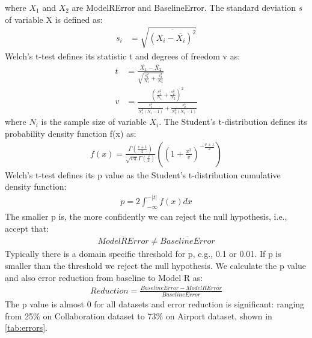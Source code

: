 \documentclass[letterpaper]{article}
\begin{document}
where $ X_1 $ and $ X_2 $ are ModelRError and BaselineError.
The standard deviation $ s $ of variable X is defined as:
\begin{align*}
	s_i &= \sqrt{\overline{(X_i - \overline{X_i})^2}}
\end{align*}
Welch's t-test defines its statistic t and degrees of freedom v as:
\begin{align*}
	t &= \frac{
		\overline{X_1} - \overline{X_2}
		}{
		\sqrt{\frac{s^2_1}{N_1} + \frac{s^2_2}{N_2}}
		}\\
	v &= \frac{
		(\frac{s^2_1}{N_1} + \frac{s^2_2}{N_2})^2
		}{
		\frac{s^4_1}{N_1^2(N_1-1)} + \frac{s^4_2}{N_2^2(N_2-1)}
		}
\end{align*}
where $ N_i $ is the sample size of variable $ X_i $.
The Student's t-distribution defines its probability density function f(x) as:
\begin{align*}
f(x) = \frac{\Gamma(\frac{v+1}{2})}{\sqrt{v\pi}\Gamma(\frac{v}{2})}
((1+\frac{x^2}{v})^{-\frac{v+1}{2}})
\end{align*}
Welch's t-test defines its p value as the Student's t-distribution cumulative density function:
\begin{align*}
p = 2 \int_{-\infty}^{-|t|} f(x) dx
\end{align*}
The smaller p is, the more confidently we can reject the null hypothesis, i.e., accept that:
\begin{align*}
\overline{ModelRError} \neq \overline{BaselineError}
\end{align*}
Typically there is a domain specific threshold for p, e.g., 0.1 or 0.01. If p is smaller than the threshold we reject the null hypothesis.
We calculate the p value and also error reduction from baseline to Model R as:
\begin{align*}
Reduction = \frac{BaselineError - ModelRError}{BaselineError}
\end{align*}
The p value is almost 0 for all datasets and error reduction is significant:
ranging from 25\% on Collaboration dataset to 73\% on Airport dataset,
shown in \autoref{tab:errors}.
\end{document}
